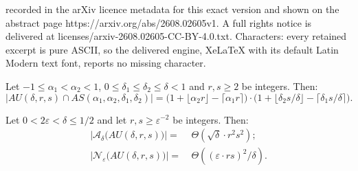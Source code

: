 \documentclass[10pt,a4paper]{amsart}
\newcommand{\eps}{\varepsilon}
\begin{document}
recorded in the arXiv licence metadata for this exact version and shown on the abstract page https://arxiv.org/abs/2608.02605v1. A full rights notice is delivered at licenses/arxiv-2608.02605-CC-BY-4.0.txt. Characters: every retained excerpt is pure ASCII, so the delivered engine, XeLaTeX with its default Latin Modern text font, reports no missing character.
\begin{lem}\label{lem:annulus-count}
        Let $-1\leq \alpha_1<\alpha_2<1$, $0\leq \delta_1\leq \delta_2\leq \delta<1$ and $r,s\geq 2$ be integers. Then: 
        $$\big|AU(\delta,r,s)\cap AS(\alpha_1,\alpha_2,\delta_1,\delta_2)\big|=\big(1+\lfloor \alpha_2r\rfloor-\lceil \alpha_1r\rceil\big)\cdot\big(1+\lfloor \delta_2s/\delta\rfloor-\lceil  \delta_1s/\delta\rceil\big).$$
\end{lem}

\begin{prop}\label{ref:annularconstr}
    Let $0<2\eps<\delta\leq 1/2$ and let $r,s\geq \eps^{-2}$ be integers. Then:
    \begin{align*}
     \left|\mathcal{A}_{\delta}\big(AU(\delta,r,s)\big)\right|=&\ \Theta\left(\sqrt{\delta}\cdot r^2s^2\right); \\
     \left|\mathcal{N}_{\eps}\big(AU(\delta,r,s)\big)\right|=&\ \Theta\left((\eps\cdot rs)^2/\delta\right).
\end{align*}
\end{prop}
\end{document}
